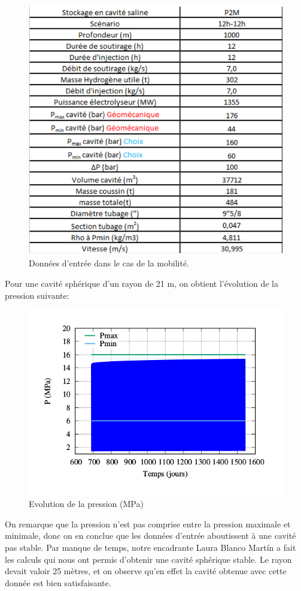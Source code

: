 \documentclass[11pt,french,a4paper]{article}
\begin{document}
\begin{figure}[h]
  \centering
  \includegraphics[width=0.65\linewidth]{image/annexe/cav_sal/p2mf.png}
  \caption{Données d'entrée dans le cas de la mobilité.}
  \end{figure}
\FloatBarrier
Pour une cavité sphérique d'un rayon de 21 m, on obtient l'évolution de la pression suivante:
\begin{figure}[h]
  \centering
  \includegraphics[width=0.8\linewidth]{image/annexe/cav_sal/P2M_faux/P.png}
  \caption{Evolution de la pression (MPa)}
  \end{figure}
\FloatBarrier
On remarque que la pression n'est pas comprise entre la pression maximale et minimale, donc on en conclue que les données d'entrée aboutissent à une cavité pas stable. Par manque de temps, notre encadrante Laura Blanco Martín a fait les calculs qui nous ont permis d'obtenir une cavité sphérique stable. Le rayon devait valoir 25 mètres, et on observe qu'en effet la cavité obtenue avec cette donnée est bien satisfaisante.
\end{document}
